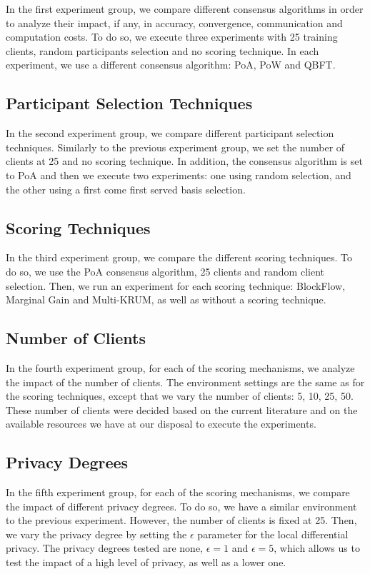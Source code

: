 In the first experiment group, we compare different consensus algorithms in order to analyze their impact, if any, in accuracy, convergence, communication and computation costs. To do so, we execute three experiments with 25 training clients, random participants selection and no scoring technique. In each experiment, we use a different consensus algorithm: PoA, PoW and QBFT.

\subsection{Participant Selection Techniques}

In the second experiment group, we compare different participant selection techniques. Similarly to the previous experiment group, we set the number of clients at 25 and no scoring technique. In addition, the consensus algorithm is set to PoA and then we execute two experiments: one using random selection, and the other using a first come first served basis selection.

\subsection{Scoring Techniques}

In the third experiment group, we compare the different scoring techniques. To do so, we use the PoA consensus algorithm, 25 clients and random client selection. Then, we run an experiment for each scoring technique: BlockFlow, Marginal Gain and Multi-KRUM, as well as without a scoring technique.

\subsection{Number of Clients}

In the fourth experiment group, for each of the scoring mechanisms, we analyze the impact of the number of clients. The environment settings are the same as for the scoring techniques, except that we vary the number of clients: 5, 10, 25, 50. These number of clients were decided based on the current literature and on the available resources we have at our disposal to execute the experiments.

\subsection{Privacy Degrees}

In the fifth experiment group, for each of the scoring mechanisms, we compare the impact of different privacy degrees. To do so, we have a similar environment to the previous experiment. However, the number of clients is fixed at 25. Then, we vary the privacy degree by setting the $\epsilon$ parameter for the local differential privacy. The privacy degrees tested are none, $\epsilon = 1$ and $\epsilon = 5$, which allows us to test the impact of a high level of privacy, as well as a lower one.

